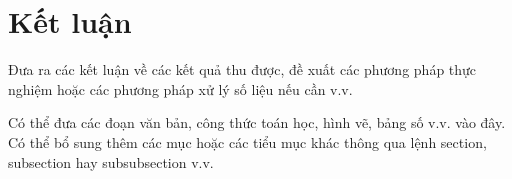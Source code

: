\chapter*{Kết luận}
\label{ch:ketluan}
\makeatletter
\makeatother

Đưa ra các kết luận về các kết quả thu được, đề xuất các phương pháp thực nghiệm hoặc các phương pháp xử lý số liệu nếu cần v.v.

Có thể đưa các đoạn văn bản, công thức toán học, hình vẽ, bảng số v.v. vào đây. Có thể bổ sung thêm các mục hoặc các tiểu mục khác thông qua lệnh section, subsection hay subsubsection v.v.